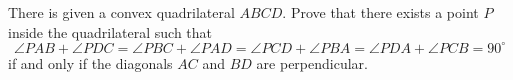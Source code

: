 There is given a convex quadrilateral $ABCD$. Prove that there exists a point $P$ inside the quadrilateral such that
\[
\angle PAB + \angle PDC = \angle PBC + \angle PAD = \angle PCD + \angle PBA = \angle PDA + \angle PCB = 90^{\circ} \tag{1}
\]
if and only if the diagonals $AC$ and $BD$ are perpendicular.
